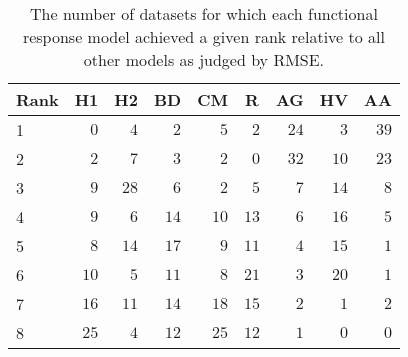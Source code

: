 \begin{table}[!tbp]
\caption{The number of datasets for which each functional response model achieved a given rank relative to all other models as judged by RMSE.\label{table:RMSE_rankings}} 
\begin{center}
\begin{tabular}{lrrrrrrrr}
\hline\hline
\multicolumn{1}{l}{Rank}&\multicolumn{1}{c}{H1}&\multicolumn{1}{c}{H2}&\multicolumn{1}{c}{BD}&\multicolumn{1}{c}{CM}&\multicolumn{1}{c}{R}&\multicolumn{1}{c}{AG}&\multicolumn{1}{c}{HV}&\multicolumn{1}{c}{AA}\tabularnewline
\hline
1&$ 0$&$ 4$&$ 2$&$ 5$&$ 2$&$24$&$ 3$&$39$\tabularnewline
2&$ 2$&$ 7$&$ 3$&$ 2$&$ 0$&$32$&$10$&$23$\tabularnewline
3&$ 9$&$28$&$ 6$&$ 2$&$ 5$&$ 7$&$14$&$ 8$\tabularnewline
4&$ 9$&$ 6$&$14$&$10$&$13$&$ 6$&$16$&$ 5$\tabularnewline
5&$ 8$&$14$&$17$&$ 9$&$11$&$ 4$&$15$&$ 1$\tabularnewline
6&$10$&$ 5$&$11$&$ 8$&$21$&$ 3$&$20$&$ 1$\tabularnewline
7&$16$&$11$&$14$&$18$&$15$&$ 2$&$ 1$&$ 2$\tabularnewline
8&$25$&$ 4$&$12$&$25$&$12$&$ 1$&$ 0$&$ 0$\tabularnewline
\hline
\end{tabular}\end{center}
\end{table}
